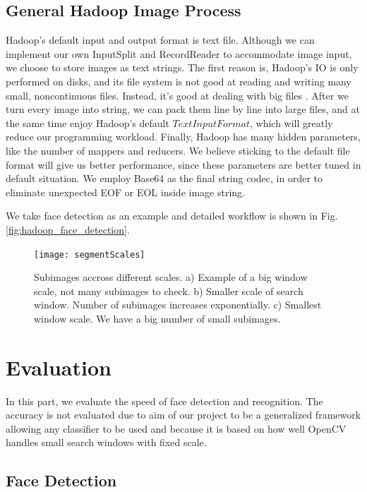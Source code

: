 \documentclass[11pt, draftclsnofoot, onecolumn]{IEEEtran}
\begin{document}
\subsection {General Hadoop Image Process}

Hadoop's default input and output format is text file. Although we can implement our own InputSplit and RecordReader to accommodate image input, we choose to store images as text strings. The first reason is, Hadoop's IO is only performed on disks, and its file system is not good at reading and writing many small, noncontinuous files. Instead, it's good at dealing with big files \cite{sweeney2011hipi}. After we turn every image into string, we can pack them line by line into large files, and at the same time enjoy Hadoop's default $TextInputFormat$, which will greatly reduce our programming workload. Finally, Hadoop has many hidden parameters, like the number of mappers and reducers. We believe sticking to the default file format will give us better performance, since these parameters are better tuned in default situation. We employ Base64 as the final string codec, in order to eliminate unexpected EOF or EOL inside image string.

We take face detection as an example and detailed workflow is shown in Fig. \ref{fig:hadoop_face_detection}.

\begin{figure}[t!]
\centering
\texttt{[image: segmentScales]}
\caption{Subimages accross different scales. a) Example of a big window scale, not many subimages to check. b) Smaller scale of search window. Number of subimages increases exponentially. c) Smallest window scale. We have a big number of small subimages. }
\end{figure}

\section{Evaluation} \label{sec:evaluation}

In this part, we evaluate the speed of face detection and recognition. The accuracy is not evaluated due to aim of our project to be a generalized framework allowing any classifier to be used and because it is based on how well OpenCV handles small search windows with fixed scale.

\subsection{Face Detection}
\end{document}
